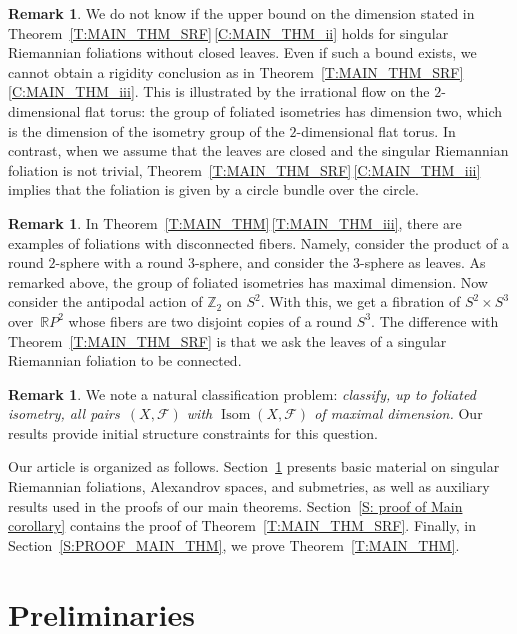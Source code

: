 \documentclass[pdftex]{sigma}
\numberwithin{equation}{section}
\theoremstyle{definition}
\newtheorem{rem}[thm]{Remark}
\DeclareMathOperator{\Iso}{Isom}
\newcommand{\R}{\mathbb{R}} %
\newcommand{\Z}{\mathbb{Z}} %
\newcommand{\fol}{\mathcal{F}}
\begin{document}
\begin{rem}
We do not know if the upper bound on the dimension stated in Theorem~\ref{T:MAIN_THM_SRF}\,\ref{C:MAIN_THM_ii} holds for singular Riemannian foliations without closed leaves. Even if such a bound exists, we cannot obtain a rigidity conclusion as in Theorem~\ref{T:MAIN_THM_SRF}\,\ref{C:MAIN_THM_iii}. This is illustrated by the irrational flow on the $2$-dimensional flat torus: the group of foliated isometries has dimension two, which is the dimension of the isometry group of the $2$-dimensional flat torus. In contrast, when we assume that the leaves are closed and the singular Riemannian foliation is not trivial, Theorem~\ref{T:MAIN_THM_SRF}\,\ref{C:MAIN_THM_iii} implies that the foliation is given by a circle bundle over the circle.
\end{rem}

\begin{rem}
In Theorem~\ref{T:MAIN_THM}\,\ref{T:MAIN_THM_iii}, there are examples of foliations with disconnected fibers. Namely, consider the product of a round $2$-sphere with a round $3$-sphere, and consider the $3$-sphere as leaves. As remarked above, the group of foliated isometries has maximal dimension. Now consider the antipodal action of $\Z_2$ on $S^2$. With this, we get a fibration of $S^2\times S^3$ over~$\R P^2$ whose fibers are two disjoint copies of a round $S^3$. The difference with Theorem~\ref{T:MAIN_THM_SRF} is that we ask the leaves of a singular Riemannian foliation to be connected.
\end{rem}

\begin{rem}
\label{R:classification.problem}
 We note a natural classification problem: \emph{classify, up to foliated isometry, all pairs~$(X,\fol)$ with $\Iso(X,\fol)$ of maximal dimension.} Our results provide initial structure constraints for this question.
\end{rem}


	
Our article is organized as follows. Section~\ref{S:PRELIMINARIES} presents basic material on singular Riemannian foliations, Alexandrov spaces, and submetries, as well as auxiliary results used in the proofs of our main theorems. Section~\ref{S: proof of Main corollary} contains the proof of Theorem~\ref{T:MAIN_THM_SRF}. Finally, in Section~\ref{S:PROOF_MAIN_THM}, we prove Theorem~\ref{T:MAIN_THM}.


\section{Preliminaries}
\label{S:PRELIMINARIES}
\end{document}
